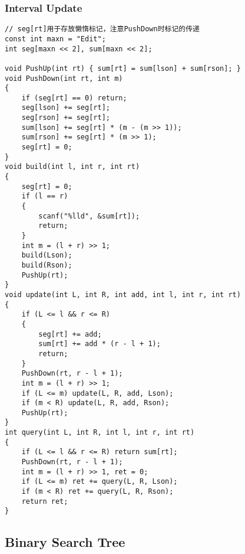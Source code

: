 \documentclass[twoside]{article}
\begin{document}
\subsubsection{Interval Update}
\begin{lstlisting}
// seg[rt]用于存放懒惰标记，注意PushDown时标记的传递
const int maxn = "Edit";
int seg[maxn << 2], sum[maxn << 2];

void PushUp(int rt) { sum[rt] = sum[lson] + sum[rson]; }
void PushDown(int rt, int m)
{
    if (seg[rt] == 0) return;
    seg[lson] += seg[rt];
    seg[rson] += seg[rt];
    sum[lson] += seg[rt] * (m - (m >> 1));
    sum[rson] += seg[rt] * (m >> 1);
    seg[rt] = 0;
}
void build(int l, int r, int rt)
{
    seg[rt] = 0;
    if (l == r)
    {
        scanf("%lld", &sum[rt]);
        return;
    }
    int m = (l + r) >> 1;
    build(Lson);
    build(Rson);
    PushUp(rt);
}
void update(int L, int R, int add, int l, int r, int rt)
{
    if (L <= l && r <= R)
    {
        seg[rt] += add;
        sum[rt] += add * (r - l + 1);
        return;
    }
    PushDown(rt, r - l + 1);
    int m = (l + r) >> 1;
    if (L <= m) update(L, R, add, Lson);
    if (m < R) update(L, R, add, Rson);
    PushUp(rt);
}
int query(int L, int R, int l, int r, int rt)
{
    if (L <= l && r <= R) return sum[rt];
    PushDown(rt, r - l + 1);
    int m = (l + r) >> 1, ret = 0;
    if (L <= m) ret += query(L, R, Lson);
    if (m < R) ret += query(L, R, Rson);
    return ret;
}
\end{lstlisting}
\subsection{Binary Search Tree}
\end{document}
